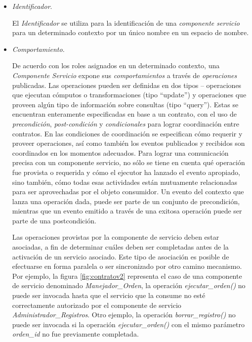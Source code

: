 \begin{itemize}

\item \textit{Identificador}.

El \textit{Identificador} se utiliza para la identificación de una \textit{componente servicio} para un determinado contexto por un único nombre en un espacio de nombre.

\item \textit{Comportamiento.}

De acuerdo con los roles asignados en un determinado contexto, una \textit{Componente Servicio} expone sus  \textit{comportamientos} a través de \textit{operaciones} publicadas. Las operaciones pueden ser definidas en dos tipos – operaciones que ejecutan cómputos o transformaciones (tipo “update”) y operaciones que proveen algún tipo de información sobre consultas (tipo “query”). Estas se encuentran enteramente especificadas en base
a un contrato, con el uso de \textit{precondición}, \textit{post-condición} y \textit{condicionales} para lograr coordinación entre contratos. En las condiciones de coordinación se especifican cómo requerir y proveer operaciones, así como también los eventos publicados y recibidos son coordinados en los momentos adecuados. Para lograr una comunicación precisa con un componente servicio, no sólo se tiene en cuenta qué operación fue provista o requerida y cómo el ejecutor ha lanzado el evento apropiado, sino también, cómo todas esas actividades están mutuamente relacionadas para ser aprovechadas por el objeto consumidor. Un evento del contexto que lanza una operación dada, puede ser parte de un conjunto de precondición, mientras que un evento emitido a través de una exitosa operación puede ser parte de una postcondición.


Las operaciones provistas por la componente de servicio deben estar asociadas, a fin de determinar cuáles deben ser completadas antes de la activación de un servicio asociado. Este tipo de asociación es posible de efectuarse en forma paralela o ser sincronizado por otro camino mecanismo. Por ejemplo, la figura \ref{fig:contratov2} representa el caso de una componente de servicio denominado \textit{Manejador\_Orden}, la operación \textit{ejecutar\_orden()} no puede ser invocada hasta que el servicio que la consume no esté correctamente autorizado por el componente de servicio \textit{Administrador\_Registros}. Otro ejemplo, la operación \textit{borrar\_registro()} no puede ser invocada si la operación \textit{ejecutar\_orden()} con el mismo parámetro \textit{orden\_id} no fue previamente completada.



\end{itemize}
